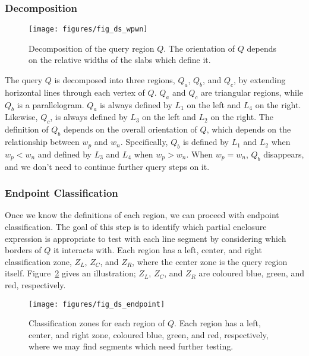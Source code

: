 \subsubsection{Decomposition}

\begin{figure}[t]
\begin{center}
  \texttt{[image: figures/fig\_ds\_wpwn]}
  \caption[Decomposition of the query region $Q$.]{Decomposition of the query region $Q$. The orientation of $Q$ depends on the relative widths of the slabs which define it.}
  \label{fig:slabs:two:wpwn}
\end{center}
\end{figure}

The query $Q$ is decomposed into three regions, $Q_a$, $Q_b$, and $Q_c$, by extending horizontal lines through each vertex of $Q$.
$Q_a$ and $Q_c$ are triangular regions, while $Q_b$ is a parallelogram. 
$Q_a$ is always defined by $L_1$ on the left and $L_4$ on the right. 
Likewise, $Q_c$, is always defined by $L_3$ on the left and $L_2$ on the right. 
The definition of $Q_b$ depends on the overall orientation of $Q$, which depends on the relationship between $w_p$ and $w_n$.
Specifically, $Q_b$ is defined by $L_1$ and $L_2$ when $w_p < w_n$ and defined by $L_3$ and $L_4$ when $w_p > w_n$.
When $w_p = w_n$, $Q_b$ disappears, and we don't need to continue further query steps on it.


\subsubsection{Endpoint Classification}

Once we know the definitions of each region, we can proceed with endpoint classification.
The goal of this step is to identify which partial enclosure expression is appropriate to test with each line segment by considering which borders of $Q$ it interacts with. 
Each region has a left, center, and right classification zone, $Z_L$, $Z_C$, and $Z_R$, where the center zone is the query region itself.
Figure~\ref{fig:slabs:two:endpoint} gives an illustration; $Z_L$, $Z_C$, and $Z_R$ are coloured blue, green, and red, respectively.

\begin{figure}[t]
\begin{center}
  \texttt{[image: figures/fig\_ds\_endpoint]}
  \caption[Classification zones for $Q$.]{Classification zones for each region of $Q$. Each region has a left, center, and right zone, coloured blue, green, and red, respectively, where we may find segments which need further testing.}
  \label{fig:slabs:two:endpoint}
\end{center}
\end{figure}


